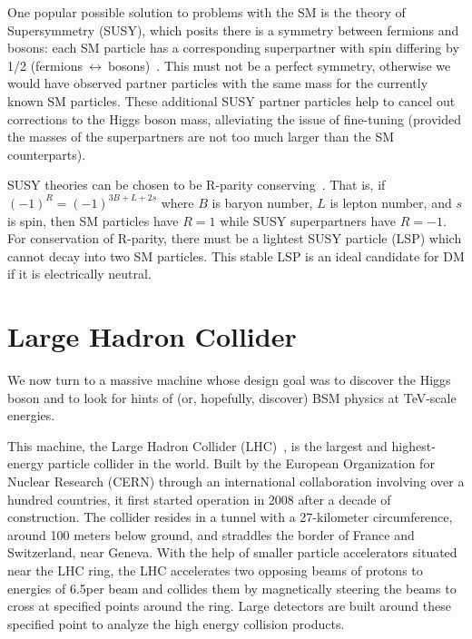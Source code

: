 One popular possible solution to problems with the SM is the theory of
Supersymmetry (SUSY), which posits there is a symmetry between fermions and
bosons: each SM particle has a corresponding superpartner with spin differing
by 1/2 (fermions$~\leftrightarrow~$bosons)~\cite{THEORY:MARTIN1998}. This
must not be a perfect symmetry, otherwise we would have observed partner
particles with the same mass for the currently known SM particles. These
additional SUSY partner particles help to cancel out corrections to the Higgs
boson mass, alleviating the issue of fine-tuning (provided the masses of the
superpartners are not too much larger than the SM counterparts).


SUSY theories can be chosen to be R-parity conserving~\cite{THEORY:mohapatra2015}. That is, if $(-1)^{R} =
(-1)^{3B+L+2s}$ where $B$ is baryon number, $L$ is lepton number, and $s$ is
spin, then SM particles have $R=1$ while SUSY superpartners have $R=-1$. For
conservation of R-parity, there must be a lightest SUSY particle (LSP) which
cannot decay into two SM particles. This stable LSP is an ideal candidate for
DM if it is electrically neutral.

\section{Large Hadron Collider}


We now turn to a massive machine whose 
design goal was to discover the Higgs boson and to
look for hints of (or, hopefully, discover) BSM physics
at TeV-scale energies.

This machine, the Large Hadron Collider (LHC)~\cite{LHC:Evans1129806}, is the largest and highest-energy
particle collider in the world.
Built by the European Organization
for Nuclear Research (CERN) through an international collaboration
involving over a hundred countries,
it first started operation in 2008 after a decade of construction. 
The collider resides in a tunnel with a 27-kilometer circumference,
around 100 meters below ground, and straddles the border of
France and Switzerland, near Geneva. With the help of smaller particle
accelerators situated near the LHC ring, the LHC accelerates two opposing 
beams of protons to energies of 6.5\TeV per beam and collides them by
magnetically steering the beams to cross at specified points around the ring. 
Large detectors are built around these specified point to analyze the
high energy collision products.

